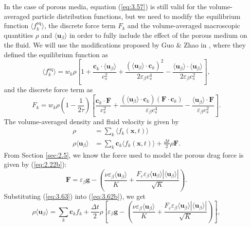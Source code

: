 \documentclass[a4paper, 11pt]{report}
\begin{document}
In the case of porous media, equation (\ref{eq:3.57}) is still valid for the volume-averaged particle distribution functions, but we need to modify the equilibrium function $\langle f_k^{\mathrm{eq}}\rangle$, the discrete force term $F_k$ and the volume-averaged macroscopic quantities $\rho$ and $\langle\mathbf{u}_\beta\rangle$ in order to fully include the effect of the porous medium on the fluid. We will use the modifications proposed by Guo \& Zhao in \cite{guo+zhao}, where they defined the equilibrium function as
\begin{equation}
    \langle f_k^{\mathrm{eq}} \rangle = w_k\rho\left[1 + \frac{\mathbf{c}_k\cdot\langle\mathbf{u}_\beta\rangle}{c_s^2} + \frac{\left(\langle\mathbf{u}_\beta\rangle\cdot\mathbf{c}_k\right)^2}{2\varepsilon_\beta c_s^4} - \frac{\langle\mathbf{u}_\beta\rangle\cdot\langle\mathbf{u}_\beta\rangle} {2\varepsilon_\beta c_s^2}\right], \label{eq:3.60}
\end{equation}
and the discrete force term as
\begin{equation}
    F_k = w_k\rho\left(1-\frac{1}{2\tau}\right)\left[\frac{\mathbf{c}_k\cdot\mathbf{F}}{c_s^2} + \frac{\left(\langle\mathbf{u}_\beta\rangle\cdot\mathbf{c}_k\right)(\mathbf{F}\cdot\mathbf{c}_k)}{\varepsilon_\beta c_s^4} - \frac{\langle\mathbf{u}_\beta\rangle\cdot\mathbf{F}}{\varepsilon_\beta c_s^2}\right]. \label{eq:3.61}
\end{equation}
The volume-averaged density and fluid velocity is given by
\begin{subequations} \label{eq:3.62}
\begin{align}
    \rho &= \sum_k \langle f_k(\mathbf{x},t) \rangle \label{eq:3.62a} \\
    \rho\langle\mathbf{u}_\beta\rangle &= \sum_k \mathbf{c}_k \langle f_k(\mathbf{x},t)\rangle + \frac{\Delta t}{2}\rho\mathbf{F}. \label{eq:3.62b}
\end{align}
\end{subequations}
From Section \ref{sec:2.5}, we know the force used to model the porous drag force is given by (\ref{eq:2.22b}):
\begin{equation}
    \mathbf{F} = \varepsilon_\beta\mathbf{g} - \left(\frac{\nu\varepsilon_\beta\langle\mathbf{u}_\beta\rangle}{K} + \frac{F_\varepsilon\varepsilon_\beta\langle\mathbf{u}_\beta\rangle\left|\langle\mathbf{u}_\beta\rangle\right|}{\sqrt{K}}\right). \label{eq:3.63}
\end{equation}
Substituting (\ref{eq:3.63}) into (\ref{eq:3.62b}), we get
\begin{equation}
    \rho\langle\mathbf{u}_\beta\rangle = \sum_k\mathbf{c}_kf_k + \frac{\Delta t}{2}\rho\left[\varepsilon_\beta\mathbf{g} - \left(\frac{\nu\varepsilon_\beta\langle\mathbf{u}_\beta\rangle}{K} + \frac{F_\varepsilon\varepsilon_\beta\langle\mathbf{u}_\beta\rangle\left|\langle\mathbf{u}_\beta\rangle\right|}{\sqrt{K}}\right)\right], \label{eq:3.64}
\end{equation}
\end{document}
